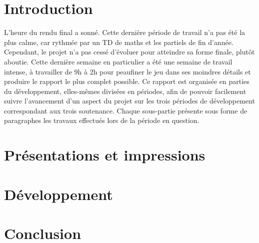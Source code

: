 \documentclass[french]{article}
\begin{document}


\tableofcontents
\vspace{2cm}

\pagestyle{fancy}

\section{Introduction}

L'heure du rendu final a sonné. Cette dernière période de travail n'a pas été la plus calme, car rythmée par un TD de maths et les partiels de fin d'année.
Cependant, le projet n'a pas cessé d'évoluer pour atteindre sa forme finale, plutôt aboutie. Cette dernière semaine en particulier a été une semaine 
de travail intense, à travailler de 9h à 2h pour peaufiner le jeu dans ses moindres détails et produire le rapport le plus complet possible.
Ce rapport est organisée en parties du développement, elles-mêmes divisées en périodes, afin de pouvoir facilement suivre l'avancement d'un 
aspect du projet sur les trois périodes de développement correspondant aux trois soutenance. Chaque sous-partie présente sous forme de paragraphes 
les travaux effectués lors de la période en question.

\newpage
\section{Présentations et impressions}



\section{Développement}












\newpage

\section{Conclusion}
\end{document}

